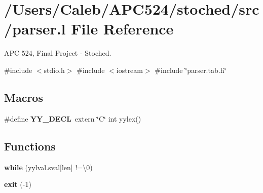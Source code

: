 \hypertarget{parser_8l}{}\section{/\+Users/\+Caleb/\+A\+P\+C524/stoched/src/parser.l File Reference}
\label{parser_8l}


A\+PC 524, Final Project -\/ Stoched.  


{\ttfamily \#include $<$stdio.\+h$>$}\newline
{\ttfamily \#include $<$iostream$>$}\newline
{\ttfamily \#include \char`\"{}parser.\+tab.\+h\char`\"{}}\newline
\subsection*{Macros}
\begin{DoxyCompactItemize}
\item 
\mbox{\label{parser_8l_ae5b01ac2fa5a6ad5fb97559638abe686}} 
\#define {\bfseries Y\+Y\+\_\+\+D\+E\+CL}~extern \char`\"{}C\char`\"{} int yylex()
\end{DoxyCompactItemize}
\subsection*{Functions}
\begin{DoxyCompactItemize}
\item 
\mbox{\label{parser_8l_a0a7c7e89fefdc969ff65d7d0ad05328f}} 
{\bfseries while} (yylval.\+sval\mbox{[}len\mbox{]} !=\textquotesingle{}\textbackslash{}0\textquotesingle{})
\item 
\mbox{\label{parser_8l_af50b3d88fee3112c7ed3cd06920e0677}} 
{\bfseries exit} (-\/1)
\end{DoxyCompactItemize}
